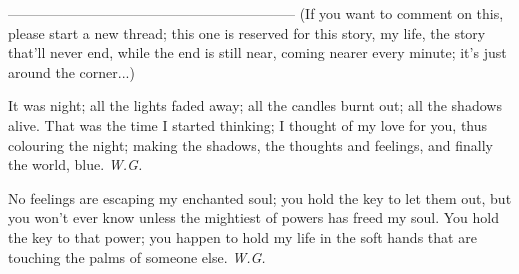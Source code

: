 --------------------------------------------------------------
(If you want to comment on this, please start a new thread; this one is reserved for this story, my life, the story that'll never end, while the end is still near, coming nearer every minute; it's just around the corner...)

It was night;
all the lights faded away;
all the candles burnt out;
all the shadows alive. 
That was the time I started thinking;
I thought of my love for you, 
thus colouring the night;
making the shadows, the thoughts and feelings,
and finally the world,
blue. 
\emph{W.G.}

No feelings are escaping my enchanted soul;
you hold the key to let them out,
but you won't ever know
unless the mightiest of powers
has freed my soul. 
You hold the key to that power;
you happen to hold my life
in the soft hands
that are touching the palms
of someone else. 
\emph{W.G.}
